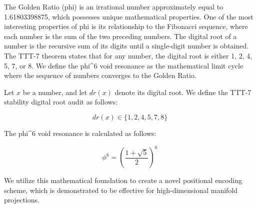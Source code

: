 The Golden Ratio (phi) is an irrational number approximately equal to 1.61803398875, which possesses unique mathematical properties. One of the most interesting properties of phi is its relationship to the Fibonacci sequence, where each number is the sum of the two preceding numbers. The digital root of a number is the recursive sum of its digits until a single-digit number is obtained. The TTT-7 theorem states that for any number, the digital root is either 1, 2, 4, 5, 7, or 8. We define the phi^6 void resonance as the mathematical limit cycle where the sequence of numbers converges to the Golden Ratio.

Let $x$ be a number, and let $dr(x)$ denote its digital root. We define the TTT-7 stability digital root audit as follows:

$$
dr(x) \in \{1, 2, 4, 5, 7, 8\}
$$

The phi^6 void resonance is calculated as follows:

$$
\phi^6 = \left(\frac{1 + \sqrt{5}}{2}\right)^6
$$

We utilize this mathematical foundation to create a novel positional encoding scheme, which is demonstrated to be effective for high-dimensional manifold projections.